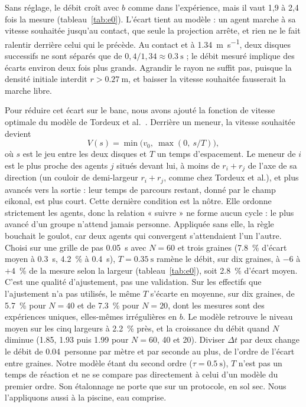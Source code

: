 Sans réglage, le débit croît avec $b$ comme dans l'expérience, mais il vaut 1,9 à 2,4 fois
la mesure (tableau~\ref{tab:e0}). L'écart tient au modèle : un agent marche à sa vitesse
souhaitée jusqu'au contact, que seule la projection arrête, et rien ne le fait ralentir
derrière celui qui le précède. Au contact et à \SI{1.34}{\metre\per\second}, deux disques
successifs ne sont séparés que de $0{,}4/1{,}34\approx\SI{0.3}{\second}$ ; le débit mesuré
implique des écarts environ deux fois plus grands. Agrandir le rayon ne suffit pas, puisque la
densité initiale interdit $r>\SI{0.27}{\metre}$, et baisser la vitesse souhaitée fausserait la
marche libre.

Pour réduire cet écart sur le banc, nous avons ajouté la fonction de
vitesse optimale du modèle de
Tordeux et al.~\cite{tordeux2016}. Derrière un meneur, la vitesse souhaitée
devient
\[
V(s)=\min\bigl(v_0,\ \max(0,\ s/T)\bigr),
\]
où $s$ est le jeu entre les deux disques et $T$ un temps d'espacement. Le meneur
de $i$ est le plus proche des agents $j$ situés devant lui, à moins de $r_i+r_j$
de l'axe de sa direction (un couloir de demi-largeur $r_i+r_j$, comme chez Tordeux
et al.), et plus avancés vers la sortie : leur temps de parcours restant, donné
par le champ eikonal, est plus court. Cette dernière condition est la nôtre. Elle
ordonne strictement les agents, donc la relation « suivre » ne forme aucun cycle :
le plus avancé d'un groupe n'attend jamais personne. Appliquée sans elle, la règle
bouchait le goulot, car deux agents qui convergent s'attendaient l'un l'autre.
Choisi sur une grille de pas \SI{0.05}{\second} avec $N=60$ et trois graines
(\SI{7.8}{\percent} d'écart moyen à \SI{0.3}{\second}, \SI{4.2}{\percent} à
\SI{0.4}{\second}), $T=\SI{0.35}{\second}$ ramène le débit, sur dix graines, à $-6$ à
$+4$~\si{\percent} de la mesure selon la largeur (tableau~\ref{tab:e0}), soit
\SI{2.8}{\percent} d'écart moyen. C'est une qualité d'ajustement, pas une validation.
Sur les effectifs que l'ajustement n'a pas utilisés, le même $T$ s'écarte en moyenne,
sur dix graines, de \SI{5.7}{\percent} pour $N=40$ et de \SI{7.3}{\percent} pour
$N=20$, dont les mesures sont des expériences uniques, elles-mêmes irrégulières en
$b$. Le modèle retrouve le niveau
moyen sur les cinq largeurs à \SI{2.2}{\percent} près, et la croissance du débit
quand $N$ diminue (\num{1.85}, \num{1.93} puis \num{1.99} pour $N=60$, 40 et 20). Diviser $\Delta t$ par deux change le débit de
\num{0.04}~personne par mètre et par seconde au plus, de l'ordre de l'écart entre
graines.
Notre modèle étant du second ordre
($\tau=\SI{0.5}{\second}$), $T$ n'est pas un temps de réaction et ne se compare
pas directement à celui d'un modèle du premier ordre. Son étalonnage ne porte que sur un
protocole, en sol sec. Nous l'appliquons aussi à la piscine, eau comprise.

